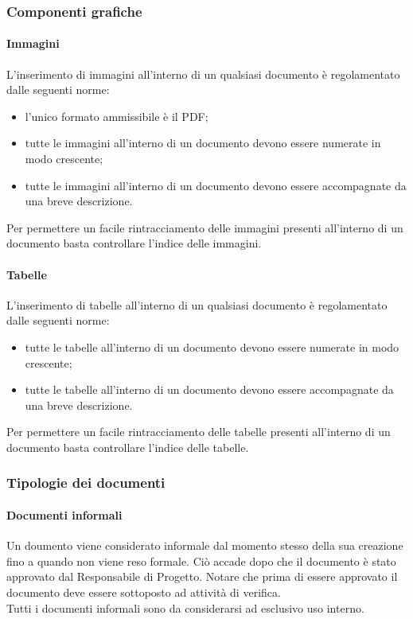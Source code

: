 		\subsubsection{Componenti grafiche}
			\paragraph{Immagini}
				L’inserimento di immagini all’interno di un qualsiasi documento è regolamentato dalle seguenti norme:
				\begin{itemize}
					\item l’unico formato ammissibile è il PDF;
					\item tutte le immagini all’interno di un documento devono essere numerate in modo crescente;
					\item tutte le immagini all’interno di un documento devono essere accompagnate da una breve descrizione.
				\end{itemize}
				Per permettere un facile rintracciamento delle immagini presenti all’interno di un documento basta controllare l’indice delle immagini.
			\paragraph{Tabelle}
				L’inserimento di tabelle all’interno di un qualsiasi documento è regolamentato dalle seguenti norme:
				\begin{itemize}
					\item tutte le tabelle all’interno di un documento devono essere numerate in modo crescente;
					\item tutte le tabelle all’interno di un documento devono essere accompagnate da una breve descrizione.
				\end{itemize}
				Per permettere un facile rintracciamento delle tabelle presenti all’interno di un documento basta controllare l’indice delle tabelle.
		\subsubsection{Tipologie dei documenti}
			\paragraph{Documenti informali}
				Un doumento viene considerato informale dal momento stesso della sua creazione fino a quando non viene reso formale. Ciò accade dopo che il documento è stato approvato dal Responsabile di Progetto. Notare che prima di essere approvato il documento deve essere sottoposto ad attività di verifica.\\
				Tutti i documenti informali sono da considerarsi ad esclusivo uso interno.
